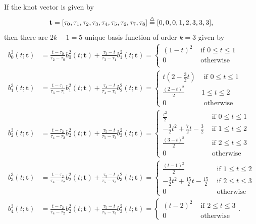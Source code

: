 If the knot vector is given by
\[
\mathbf{t} = [\tau_0, \tau_1, \tau_2, \tau_3, \tau_4, \tau_5, \tau_6, \tau_7, \tau_8] \stackrel{\triangle}{=} [0, 0, 0, 1, 2, 3, 3, 3],
\]
then there are $2k-1=5$ unique basis function of order $k=3$ given by
\begin{align*}
b_0^3(t; \mathbf{t}) &= \frac{t-\tau_0}{\tau_2-\tau_0} b_0^2(t;\mathbf{t}) + \frac{\tau_3-t}{\tau_3-\tau_1}b_1^2(t; \mathbf{t}) 
	= \begin{cases} (1-t)^2   & \text{~if~} 0 \leq t \leq 1 \\
				    0 & \text{~otherwise~}  \\ 
 	  \end{cases}
\\ 
b_1^3(t; \mathbf{t}) &= \frac{t-\tau_1}{\tau_3-\tau_1} b_1^2(t;\mathbf{t}) + \frac{\tau_4-t}{\tau_4-\tau_2}b_2^2(t; \mathbf{t})
	= \begin{cases} t(2-\frac{3}{2}t) & \text{~if~} 0 \leq t \leq 1 \\ 
 									\frac{(2-t)^2}{2} & 1 \leq t \leq 2 \\
 									0 & \text{~otherwise}
 					    \end{cases}
\\ 
b_2^3(t; \mathbf{t}) &= \frac{t-\tau_2}{\tau_4-\tau_2} b_2^2(t;\mathbf{t}) + \frac{\tau_5-t}{\tau_5-\tau_3}b_3^2(t; \mathbf{t})
	= \begin{cases} \frac{t^2}{2} & \text{~if~} 0 \leq t \leq 1 \\ 
 					-\frac{3}{2}t^2 + \frac{7}{2}t - \frac{3}{2} & \text{~if~} 1 \leq t \leq 2 \\
 					\frac{(3-t)^2}{2} & \text{~if~} 2 \leq t \leq 3 \\
 					0 & \text{~otherwise}
 	  \end{cases}
\\ 
b_3^3(t; \mathbf{t}) &= \frac{t-\tau_2}{\tau_4-\tau_2} b_2^2(t;\mathbf{t}) + \frac{\tau_5-t}{\tau_5-\tau_3}b_3^2(t; \mathbf{t})
	= \begin{cases} \frac{(t-1)^2}{2} & \text{~if~} 1 \leq t \leq 2 \\ 
 					-\frac{3}{2}t^2 + \frac{15}{2}t-\frac{15}{2} & \text{~if~} 2 \leq t \leq 3 \\
 					0 & \text{~otherwise}
 	  \end{cases}
\\ 
b_4^3(t; \mathbf{t}) &= \frac{t-\tau_2}{\tau_4-\tau_2} b_2^2(t;\mathbf{t}) + \frac{\tau_5-t}{\tau_5-\tau_3}b_3^2(t; \mathbf{t})
	= \begin{cases} (t-2)^2 & \text{~if~} 2 \leq t \leq 3 \\ 
 					0 & \text{~otherwise}
 	  \end{cases}.	   	  
\end{align*}
